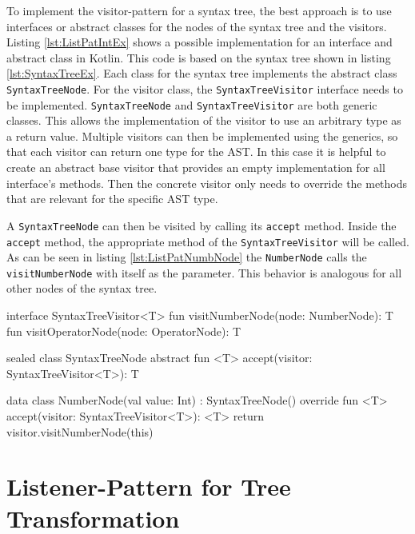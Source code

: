 To implement the visitor-pattern for a syntax tree, the best approach is to use interfaces or abstract classes for the nodes of the syntax tree and the visitors. Listing \ref{lst:ListPatIntEx} shows a possible implementation for an interface and abstract class in Kotlin. This code is based on the syntax tree shown in listing \ref{lst:SyntaxTreeEx}. Each class for the syntax tree implements the  abstract class \texttt{SyntaxTreeNode}. For the visitor class, the \texttt{SyntaxTreeVisitor} interface needs to be implemented. \texttt{SyntaxTreeNode} and \texttt{SyntaxTreeVisitor} are both generic classes. This allows the implementation of the visitor to use an arbitrary type as a return value. Multiple visitors can then be implemented using the generics, so that each visitor can return one type for the AST. In this case it is helpful to create an abstract base visitor that provides an empty implementation for all interface's methods. Then the concrete visitor only needs to override the methods that are relevant for the specific AST type.  

A \texttt{SyntaxTreeNode} can then be visited by calling its \texttt{accept} method. Inside the \texttt{accept} method, the appropriate method of the \texttt{SyntaxTreeVisitor} will be called. As can be seen in listing \ref{lst:ListPatNumbNode} the \texttt{NumberNode} calls the \texttt{visitNumberNode} with itself as the parameter. This behavior is analogous for all other nodes of the syntax tree. 


\begin{KotlinCode}[float,numbers=none,caption=Interface and abstract class used to implement the visitor-pattern., label=lst:ListPatIntEx]
interface SyntaxTreeVisitor<T> {
    fun visitNumberNode(node: NumberNode): T
    fun visitOperatorNode(node: OperatorNode): T
}

sealed class SyntaxTreeNode {
    abstract fun <T> accept(visitor: SyntaxTreeVisitor<T>): T
}
\end{KotlinCode}


\begin{KotlinCode}[float,numbers=none,caption=Implementation of the \texttt{NumberNode} class inheriting from the \texttt{SyntaxTreeNode}., label=lst:ListPatNumbNode]
  data class NumberNode(val value: Int) : SyntaxTreeNode() {
    override fun <T> accept(visitor: SyntaxTreeVisitor<T>): <T> {
        return visitor.visitNumberNode(this)
    }
}
  \end{KotlinCode}


\section{Listener-Pattern for Tree Transformation}

